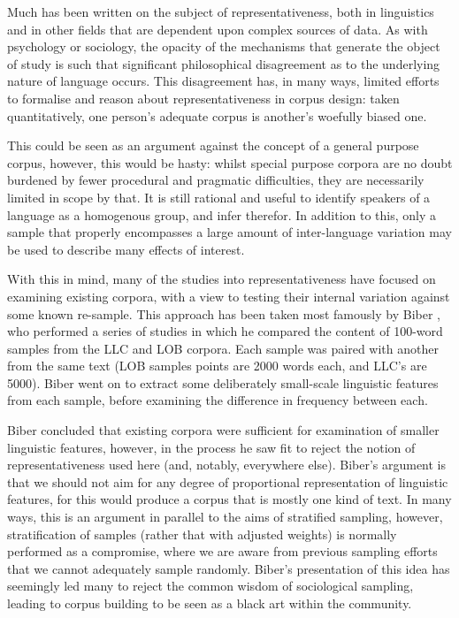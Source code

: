 Much has been written on the subject of representativeness, both in linguistics and in other fields that are dependent upon complex sources of data.  As with psychology or sociology, the opacity of the mechanisms that generate the object of study is such that significant philosophical disagreement as to the underlying nature of language occurs.  This disagreement has, in many ways, limited efforts to formalise and reason about representativeness in corpus design: taken quantitatively, one person's adequate corpus is another's woefully biased one.

This could be seen as an argument against the concept of a general purpose corpus, however, this would be hasty: whilst special purpose corpora are no doubt burdened by fewer procedural and pragmatic difficulties, they are necessarily limited in scope by that.  It is still rational and useful to identify speakers of a language as a homogenous group, and infer therefor.  In addition to this, only a sample that properly encompasses a large amount of inter-language variation may be used to describe many effects of interest.

With this in mind, many of the studies into representativeness have focused on examining existing corpora, with a view to testing their internal variation against some known re-sample.  This approach has been taken most famously by Biber %
, who performed a series of studies in which he compared the content of 100-word samples from the LLC and LOB corpora.  Each sample was paired with another from the same text (LOB samples points are 2000 words each, and LLC's are 5000).  Biber went on to extract some deliberately small-scale linguistic features from each sample, before examining the difference in frequency between each.

Biber concluded that existing corpora were sufficient for examination of smaller linguistic features, however, in the process he saw fit to reject the notion of representativeness used here (and, notably, everywhere else).  Biber's argument is that we should not aim for any degree of proportional representation of linguistic features, for this would produce a corpus that is mostly one kind of text.  In many ways, this is an argument in parallel to the aims of stratified sampling, however, stratification of samples (rather that with adjusted weights) is normally performed as a compromise, where we are aware from previous sampling efforts that we cannot adequately sample randomly.  Biber's presentation of this idea has seemingly led many to reject the common wisdom of sociological sampling, leading to corpus building to be seen as a black art within the community.

